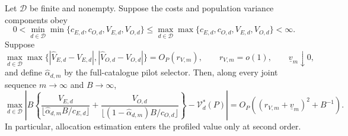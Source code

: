 Let \(\mathcal D\) be finite and nonempty. Suppose the costs and population variance components obey
\[
0<\min_{d\in\mathcal D}\min\{c_{E,d},c_{O,d},V_{E,d},V_{O,d}\}
\le
\max_{d\in\mathcal D}\max\{c_{E,d},c_{O,d},V_{E,d},V_{O,d}\}<\infty.
\]
Suppose
\[
\max_{d\in\mathcal D}\max\bigl\{
|\widehat V_{E,d}-V_{E,d}|,
|\widehat V_{O,d}-V_{O,d}|\bigr\}=O_P(r_{V,m}),
\qquad r_{V,m}=o(1),
\qquad \underline v_m\downarrow0,
\]
and define \(\widehat\alpha_{d,m}\) by the full-catalogue pilot selector. Then, along every joint sequence \(m\to\infty\) and \(B\to\infty\),
\[
\max_{d\in\mathcal D}\left|B\left\{
\frac{V_{E,d}}{\lfloor\widehat\alpha_{d,m}B/c_{E,d}\rfloor}
+\frac{V_{O,d}}{\lfloor(1-\widehat\alpha_{d,m})B/c_{O,d}\rfloor}
\right\}-\mathcal V_d^*(P)\right|
=O_P\!\left((r_{V,m}+\underline v_m)^2+B^{-1}\right).
\]
In particular, allocation estimation enters the profiled value only at second order.
